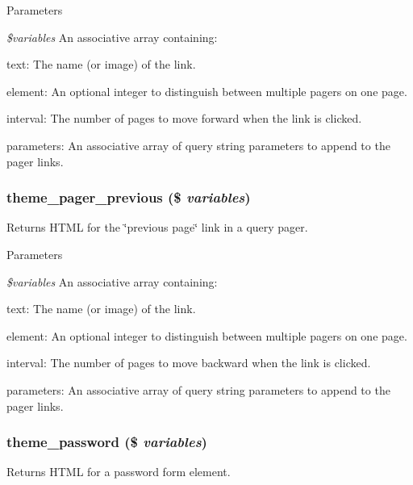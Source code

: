 \begin{DoxyParams}{Parameters}
\item[{\em \$variables}]An associative array containing:
\begin{DoxyItemize}
\item text: The name (or image) of the link.
\item element: An optional integer to distinguish between multiple pagers on one page.
\item interval: The number of pages to move forward when the link is clicked.
\item parameters: An associative array of query string parameters to append to the pager links. 
\end{DoxyItemize}\end{DoxyParams}
\hypertarget{group__themeable_gae703c543e6dbae14df5da1451d6eaf03}{
\subsubsection[{theme\_\-pager\_\-previous}]{\setlength{\rightskip}{0pt plus 5cm}theme\_\-pager\_\-previous (\$ {\em variables})}}
\label{group__themeable_gae703c543e6dbae14df5da1451d6eaf03}
Returns HTML for the \char`\"{}previous page\char`\"{} link in a query pager.


\begin{DoxyParams}{Parameters}
\item[{\em \$variables}]An associative array containing:
\begin{DoxyItemize}
\item text: The name (or image) of the link.
\item element: An optional integer to distinguish between multiple pagers on one page.
\item interval: The number of pages to move backward when the link is clicked.
\item parameters: An associative array of query string parameters to append to the pager links. 
\end{DoxyItemize}\end{DoxyParams}
\hypertarget{group__themeable_gabef0b99822b6dcb684b2a447f49a8086}{
\subsubsection[{theme\_\-password}]{\setlength{\rightskip}{0pt plus 5cm}theme\_\-password (\$ {\em variables})}}
\label{group__themeable_gabef0b99822b6dcb684b2a447f49a8086}
Returns HTML for a password form element.


